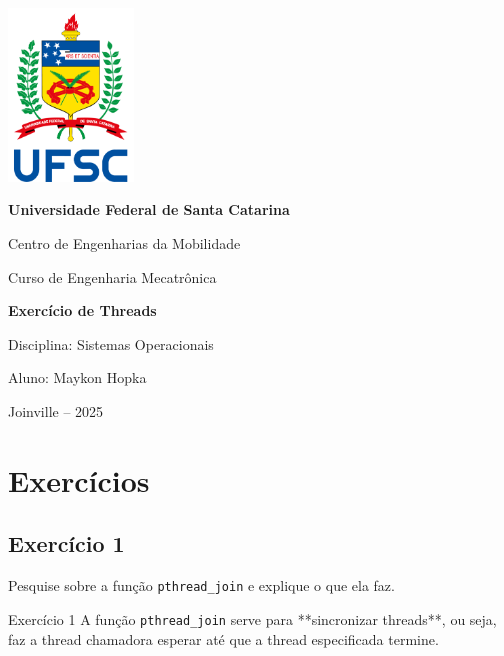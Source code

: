 \documentclass[14pt,a4paper]{article}
\begin{document}
\begin{titlepage}
    \centering
    
    \includegraphics[width=0.25\textwidth]{logo_ufsc.png}\par\vspace{1cm}
    
    {\Large\bfseries Universidade Federal de Santa Catarina \par}
    \vspace{0.5cm}
    {\large Centro de Engenharias da Mobilidade \par}
    {\large Curso de Engenharia Mecatrônica \par}
    \vfill
    
    {\Huge\bfseries Exercício de Threads \par}
    \vspace{0.5cm}
    {\Large Disciplina: Sistemas Operacionais\par}
    \vspace{0.3cm}
    {\large Aluno: Maykon Hopka \par}
    \vfill
    
    {\large Joinville – 2025}
\end{titlepage}

\section{Exercícios}

\subsection*{Exercício 1}
Pesquise sobre a função \texttt{pthread\_join} e explique o que ela faz.

\begin{solucao}{Exercício 1}{}
A função \texttt{pthread\_join} serve para **sincronizar threads**,  
ou seja, faz a thread chamadora esperar até que a thread especificada termine. 
\end{solucao}
\end{document}
